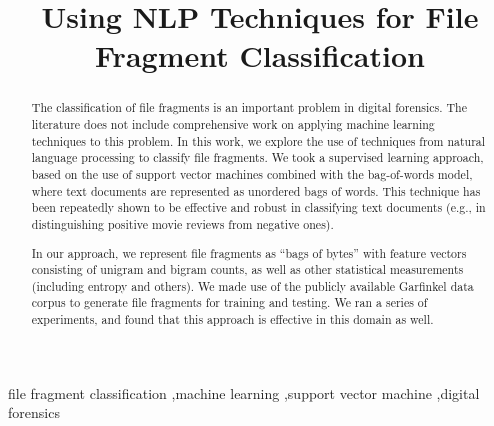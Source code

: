 \documentclass[5p]{elsarticle}
\begin{document}
\begin{frontmatter}



\title{Using NLP Techniques for File Fragment Classification}



\address{}

\begin{abstract}
The classification of file fragments is an important problem in digital forensics. The literature does not include comprehensive work on applying machine learning techniques to this problem. In this work, we explore the use of techniques from natural language processing to classify file fragments. We took a supervised learning approach, based on the use of support vector machines combined with the bag-of-words model, where text documents are represented as unordered bags of words. This technique has been repeatedly shown to be effective and robust in classifying text documents (e.g., in distinguishing positive movie reviews from negative ones).

In our approach, we represent file fragments as ``bags of bytes'' with feature vectors consisting of unigram and bigram counts, as well as other statistical measurements (including entropy and others). We made use of the publicly available Garfinkel data corpus to generate file fragments for training and testing. We ran a series of experiments, and found that this approach is effective in this domain as well.
\end{abstract}

\begin{keyword}
file fragment classification \sep machine learning \sep support vector machine \sep digital forensics


\end{keyword}

\end{frontmatter}
\end{document}
